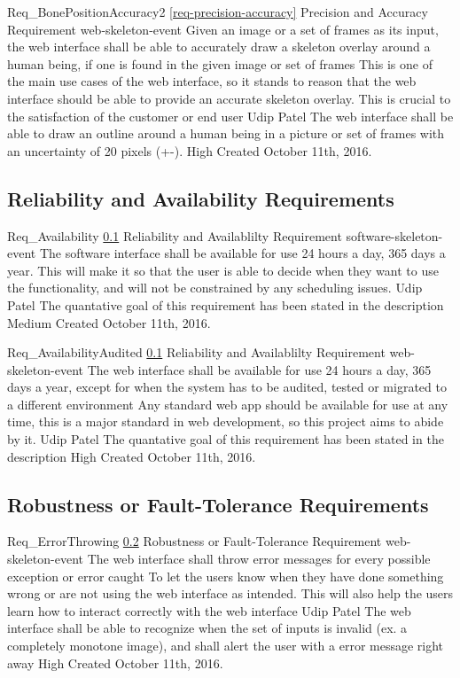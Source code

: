 \documentclass{scrreprt}
\begin{document}
\requirement
{Req_BonePositionAccuracy2}
{\ref{req-precision-accuracy} Precision and Accuracy Requirement}
{web-skeleton-event}
{Given an image or a set of frames as its input, the web interface shall be able to accurately draw a skeleton overlay around a human being, if one is found in the given image or set of frames}
{This is one of the main use cases of the web interface, so it stands to reason that the web interface should be able to provide an accurate skeleton overlay. This is crucial to the satisfaction of the customer or end user }
{Udip Patel}
{The web interface shall be able to draw an outline around a human being in a picture or set of frames with an uncertainty of 20 pixels (+-).}
{High}
{Created October 11th, 2016.}

\subsection{Reliability and Availability Requirements}
\label{req-reliability-availability}
\requirement
{Req_Availability}
{\ref{req-reliability-availability} Reliability and Availablilty Requirement}
{software-skeleton-event}
{The software interface shall be available for use 24 hours a day, 365 days a year.}
{This will make it so that the user is able to decide when they want to use the functionality, and will not be constrained by any scheduling issues.}
{Udip Patel}
{The quantative goal of this requirement has been stated in the description}
{Medium}
{Created October 11th, 2016.}

\requirement
{Req_AvailabilityAudited}
{\ref{req-reliability-availability} Reliability and Availablilty Requirement}
{web-skeleton-event}
{The web interface shall be available for use 24 hours a day, 365 days a year, except for when the system has to be audited, tested or migrated to a different environment}
{Any standard web app should be available for use at any time, this is a major standard in web development, so this project aims to abide by it.}
{Udip Patel}
{The quantative goal of this requirement has been stated in the description}
{High}
{Created October 11th, 2016.}

\subsection{Robustness or Fault-Tolerance Requirements}

\label{req-robustness}
\requirement
{Req_ErrorThrowing}
{\ref{req-robustness} Robustness or Fault-Tolerance Requirement}
{web-skeleton-event}
{The web interface shall throw error messages for every possible exception or error caught}
{To let the users know when they have done something wrong or are not using the web interface as intended. This will also help the users learn how to interact correctly with the web interface}
{Udip Patel}
{The web interface shall be able to recognize when the set of inputs is invalid (ex. a completely monotone image), and shall alert the user with a error message right away}
{High}
{Created October 11th, 2016.}
\end{document}
